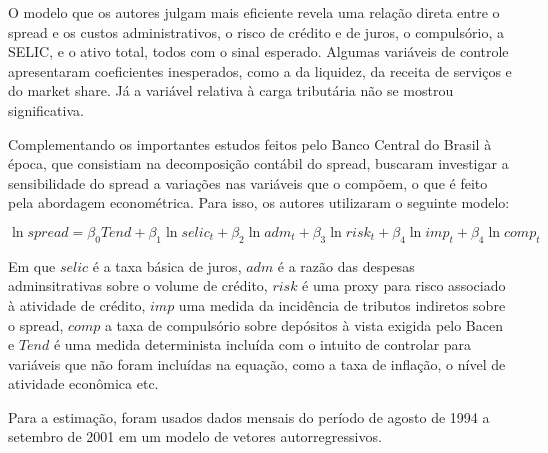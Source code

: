 \documentclass[a4paper, 12pt, openany, oneside, brazil]{abntex2}
\begin{document}
    O modelo que os autores julgam mais eficiente revela uma relação direta
    entre o spread e os custos administrativos, o risco de crédito e de juros, o
    compulsório, a SELIC, e o ativo total, todos com o sinal esperado. Algumas
    variáveis de controle apresentaram coeficientes inesperados, como a da
    liquidez, da receita de serviços e do market share. Já a variável relativa à
    carga tributária não se mostrou significativa.

    Complementando os importantes estudos feitos pelo Banco Central do Brasil à
    época, que consistiam na decomposição contábil do spread,
     buscaram investigar a sensibilidade do spread a
    variações nas variáveis que o compõem, o que é feito pela abordagem
    econométrica. Para isso, os autores utilizaram o seguinte modelo:

    $$\ln spread = \beta_0Tend + \beta_1\ln selic_t + \beta_2\ln adm_t +
    \beta_3\ln risk_t + \beta_4\ln imp_t + \beta_4\ln comp_t$$

    Em que $selic$ é a taxa básica de juros, $adm$ é a razão das despesas
    adminsitrativas sobre o volume de crédito, $risk$ é uma proxy para risco
    associado à atividade de crédito, $imp$ uma medida da incidência de tributos
    indiretos sobre o spread, $comp$ a taxa de compulsório sobre depósitos à
    vista exigida pelo Bacen e $Tend$ é uma medida determinista incluída com o
    intuito de controlar para variáveis que não foram incluídas na equação, como
    a taxa de inflação, o nível de atividade econômica etc.

    Para a estimação, foram usados dados mensais do período de agosto de 1994 a
    setembro de 2001 em um modelo de vetores autorregressivos. 


\end{document}
